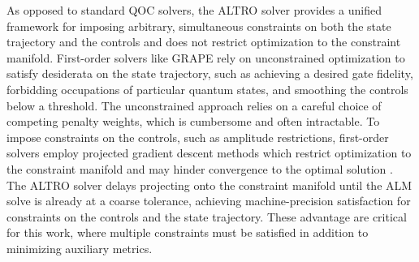 As opposed to standard QOC solvers, the ALTRO solver provides a unified framework
for imposing arbitrary, simultaneous constraints
on both the state trajectory and the controls and does not restrict
optimization to the constraint manifold. First-order solvers like GRAPE
rely on unconstrained optimization to satisfy desiderata on the state trajectory,
such as achieving a desired gate fidelity, forbidding occupations of particular quantum states,
and smoothing the controls below a threshold. The unconstrained approach relies
on a careful choice of competing penalty weights, which is cumbersome and often intractable.
To impose constraints on the controls, such as amplitude restrictions, first-order solvers
employ projected gradient descent methods which restrict optimization to the constraint manifold and
may hinder convergence to the optimal solution \cite{clarkson2010coresets,
  hauswirth2016projected}.
The ALTRO solver delays projecting onto the constraint manifold until the ALM
solve is already at a coarse tolerance, achieving machine-precision satisfaction
for constraints on the controls and the state trajectory. These advantage are critical
for this work, where multiple constraints must be satisfied in addition
to minimizing auxiliary metrics.


